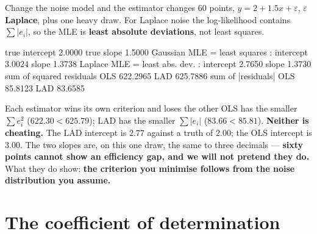 \documentclass[aspectratio=169]{beamer}
\begin{document}
\begin{frame}[fragile,shrink=8]{Change the noise model and the estimator changes}
$60$ points, $y = 2 + 1.5x + \varepsilon$, $\varepsilon$ \textbf{Laplace},
plus one heavy draw. For Laplace noise the log-likelihood contains
$\sum|e_i|$, so the MLE is \textbf{least absolute deviations}, not least
squares.
\begin{outblk}
true intercept 2.0000  true slope 1.5000
Gaussian MLE  = least squares    : intercept 3.0024  slope 1.3738
Laplace  MLE  = least abs. dev.  : intercept 2.7650  slope 1.3730
sum of squared residuals  OLS 622.2965   LAD 625.7886
sum of |residuals|        OLS 85.8123   LAD 83.6585
\end{outblk}
\begin{alertblock}{Each estimator wins its own criterion and loses the other}
  \footnotesize OLS has the smaller $\sum e_i^2$ ($622.30 < 625.79$); LAD has
  the smaller $\sum|e_i|$ ($83.66 < 85.81$). \textbf{Neither is cheating.}
  The LAD intercept is $2.77$ against a truth of $2.00$; the OLS intercept is
  $3.00$. The two slopes are, on this one draw, the same to three decimals ---
  \textbf{sixty points cannot show an efficiency gap, and we will not pretend
  they do.} What they do show: \textbf{the criterion you minimise follows from
  the noise distribution you assume.}
\end{alertblock}
\end{frame}

\section[$R^2$]{The coefficient of determination}
\label{sec:r2}
\end{document}
